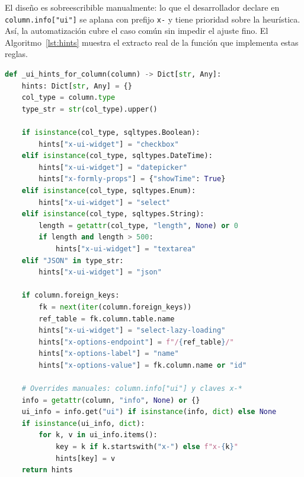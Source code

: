 El diseño es sobreescribible manualmente: lo que el desarrollador
declare en \texttt{column.\allowbreak info["ui"]} se aplana con prefijo \texttt{x-} y tiene
prioridad sobre la heurística. Así, la automatización cubre el caso común sin
impedir el ajuste fino. El Algoritmo~\ref{lst:hints} muestra el extracto real
de la función que implementa estas reglas.

\begin{lstlisting}[language=Python, caption={Heurística de pistas de UI por columna (\texttt{utils/common.py})}, label={lst:hints}]
def _ui_hints_for_column(column) -> Dict[str, Any]:
    hints: Dict[str, Any] = {}
    col_type = column.type
    type_str = str(col_type).upper()

    if isinstance(col_type, sqltypes.Boolean):
        hints["x-ui-widget"] = "checkbox"
    elif isinstance(col_type, sqltypes.DateTime):
        hints["x-ui-widget"] = "datepicker"
        hints["x-formly-props"] = {"showTime": True}
    elif isinstance(col_type, sqltypes.Enum):
        hints["x-ui-widget"] = "select"
    elif isinstance(col_type, sqltypes.String):
        length = getattr(col_type, "length", None) or 0
        if length and length > 500:
            hints["x-ui-widget"] = "textarea"
    elif "JSON" in type_str:
        hints["x-ui-widget"] = "json"

    if column.foreign_keys:
        fk = next(iter(column.foreign_keys))
        ref_table = fk.column.table.name
        hints["x-ui-widget"] = "select-lazy-loading"
        hints["x-options-endpoint"] = f"/{ref_table}/"
        hints["x-options-label"] = "name"
        hints["x-options-value"] = fk.column.name or "id"

    # Overrides manuales: column.info["ui"] y claves x-*
    info = getattr(column, "info", None) or {}
    ui_info = info.get("ui") if isinstance(info, dict) else None
    if isinstance(ui_info, dict):
        for k, v in ui_info.items():
            key = k if k.startswith("x-") else f"x-{k}"
            hints[key] = v
    return hints
\end{lstlisting}

